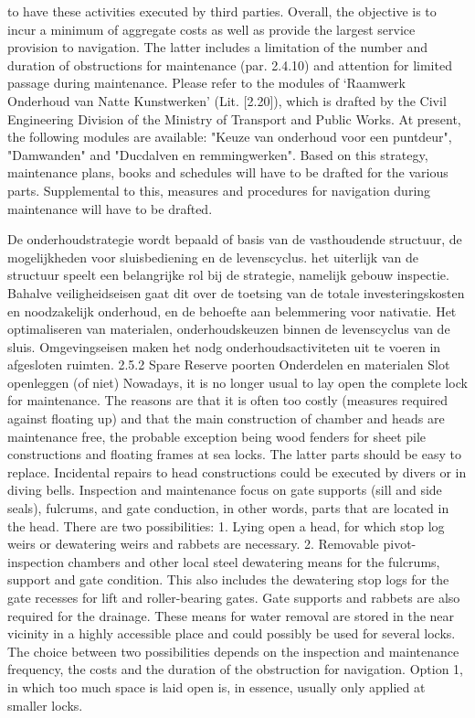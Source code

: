 to have these activities executed by third parties.
Overall, the objective is to incur a minimum of aggregate costs as well as provide the largest service
provision to navigation. The latter includes a limitation of the number and duration of obstructions for
maintenance (par. 2.4.10) and attention for limited passage during maintenance. Please refer to the
modules of ‘Raamwerk Onderhoud van Natte Kunstwerken’ (Lit. [2.20]), which is drafted by the Civil
Engineering Division of the Ministry of Transport and Public Works. At present, the following modules
are available: "Keuze van onderhoud voor een puntdeur", "Damwanden" and "Ducdalven en remmingwerken".
Based on this strategy, maintenance plans, books and schedules will have to be drafted for the various
parts. Supplemental to this, measures and procedures for navigation during maintenance will have to be
drafted.

De onderhoudstrategie wordt bepaald of basis van de vasthoudende structuur, de mogelijkheden voor sluisbediening en de levenscyclus. het uiterlijk van de structuur speelt een belangrijke rol bij de strategie, namelijk gebouw inspectie. Bahalve veiligheidseisen gaat dit over de toetsing van  de totale investeringskosten en noodzakelijk onderhoud, en de behoefte aan belemmering voor nativatie. Het optimaliseren van materialen, onderhoudskeuzen binnen de levenscyclus van de sluis. Omgevingseisen maken het nodg onderhoudsactiviteten uit  te voeren in afgesloten ruimten.
2.5.2 Spare
Reserve poorten
Onderdelen en materialen
Slot openleggen (of niet)
Nowadays, it is no longer usual to lay open the complete lock for maintenance. The reasons are that it
is often too costly (measures required against floating up) and that the main construction of chamber
and heads are maintenance free, the probable exception being wood fenders for sheet pile constructions
and floating frames at sea locks. The latter parts should be easy to replace. Incidental repairs to head
constructions could be executed by divers or in diving bells.
Inspection and maintenance focus on gate supports (sill and side seals), fulcrums, and gate conduction,
in other words, parts that are located in the head. There are two possibilities:
1. Lying open a head, for which stop log weirs or dewatering weirs and rabbets are necessary.
2. Removable pivot-inspection chambers and other local steel dewatering means for the fulcrums,
support and gate condition. This also includes the dewatering stop logs for the gate recesses for lift
and roller-bearing gates.
Gate supports and rabbets are also required for the drainage. These means for water removal are stored
in the near vicinity in a highly accessible place and could possibly be used for several locks.
The choice between two possibilities depends on the inspection and maintenance frequency, the costs
and the duration of the obstruction for navigation. Option 1, in which too much space is laid open is, in
essence, usually only applied at smaller locks.

